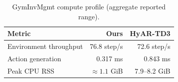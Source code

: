 \begin{table}[t]\centering\small\caption{GymInvMgmt compute profile (aggregate reported range).}\label{tab:gymcompute}\begin{tabular}{lrr}\toprule Metric & Ours & HyAR-TD3\\\midrule Environment throughput & 76.8 step/s & 72.6 step/s\\ Action generation & 0.317 ms & 0.843 ms\\ Peak CPU RSS & $\approx1.1$ GiB & 7.9--8.2 GiB\\\bottomrule\end{tabular}\end{table}
